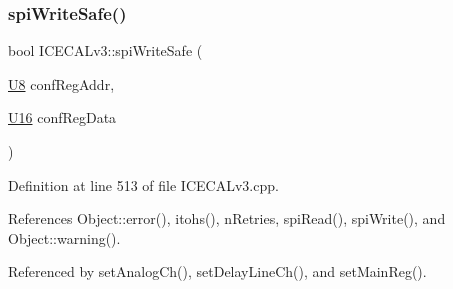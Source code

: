 \subsubsection{\texorpdfstring{spi\+Write\+Safe()}{spiWriteSafe()}}
{\footnotesize\ttfamily bool I\+C\+E\+C\+A\+Lv3\+::spi\+Write\+Safe (\begin{DoxyParamCaption}\item[{\hyperlink{ICECALv3_8h_a3cb25ca6f51f003950f9625ff05536fc}{U8}}]{conf\+Reg\+Addr,  }\item[{\hyperlink{ICECALv3_8h_adf928e51a60dba0df29d615401cc55a8}{U16}}]{conf\+Reg\+Data }\end{DoxyParamCaption})\hspace{0.3cm}{\ttfamily [private]}}



Definition at line 513 of file I\+C\+E\+C\+A\+Lv3.\+cpp.



References Object\+::error(), itohs(), n\+Retries, spi\+Read(), spi\+Write(), and Object\+::warning().



Referenced by set\+Analog\+Ch(), set\+Delay\+Line\+Ch(), and set\+Main\+Reg().


